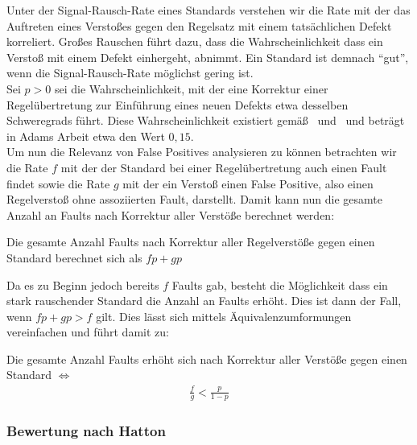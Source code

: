 \documentclass[a4paper,UKenglish,cleveref, autoref]{templates/lipics-v2019}
\begin{document}
    Unter der Signal-Rausch-Rate eines Standards verstehen wir die Rate mit der das Auftreten eines Verstoßes gegen den Regelsatz mit einem
    tatsächlichen Defekt korreliert.
    Großes Rauschen führt dazu, dass die Wahrscheinlichkeit dass ein Verstoß mit einem Defekt einhergeht, abnimmt.
    Ein Standard ist demnach \enquote{gut}, wenn die Signal-Rausch-Rate möglichst gering ist.\\
    Sei $p > 0$ sei die Wahrscheinlichkeit, mit der eine Korrektur einer Regelübertretung zur Einführung eines neuen Defekts
    etwa desselben Schweregrads führt.
    Diese Wahrscheinlichkeit existiert gemäß~\cite{transgression-data} und~\cite{hatton2007language} und beträgt in
    Adams Arbeit etwa den Wert $0,15$.\\
    Um nun die Relevanz von False Positives analysieren zu können betrachten wir die Rate $f$ mit der der Standard
    bei einer Regelübertretung auch einen Fault findet sowie die Rate $g$ mit der ein Verstoß einen False Positive, also
    einen Regelverstoß ohne assoziierten Fault, darstellt.
    Damit kann nun die gesamte Anzahl an Faults nach Korrektur aller Verstöße berechnet werden:
    \begin{lemma}
        Die gesamte Anzahl Faults nach Korrektur aller Regelverstöße gegen einen Standard berechnet sich als $fp + gp$
    \end{lemma}

    Da es zu Beginn jedoch bereits $f$ Faults gab, besteht die Möglichkeit dass ein stark rauschender Standard die Anzahl
    an Faults erhöht.
    Dies ist dann der Fall, wenn $fp + gp > f$ gilt.
    Dies lässt sich mittels Äquivalenzumformungen vereinfachen und führt damit zu:

    \begin{theorem}
        Die gesamte Anzahl Faults erhöht sich nach Korrektur aller Verstöße gegen einen Standard $\iff$
        \begin{gather*}
            \frac{f}{g} < \frac{p}{1-p}
        \end{gather*}
    \end{theorem}

    \subsubsection{Bewertung nach Hatton}
\end{document}
